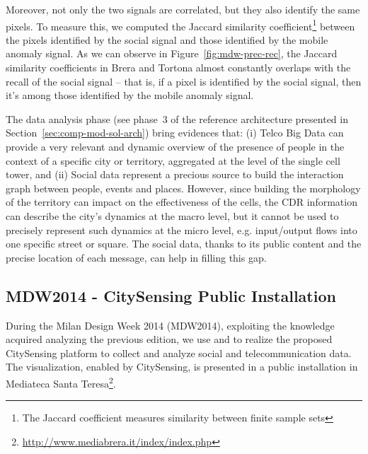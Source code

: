 Moreover, not only the two signals are correlated, but they also identify the same pixels. To measure this, we computed the Jaccard similarity coefficient\footnote{The Jaccard coefficient measures similarity between finite sample sets} between the pixels identified by the social signal and those identified by the mobile anomaly signal. 
As we can observe in Figure~\ref{fig:mdw-prec-rec}, the Jaccard similarity coefficients in Brera and Tortona almost constantly overlaps with the recall of the social signal -- that is, if a pixel is identified by the social signal, then it's among those identified by the mobile anomaly signal.


The data analysis phase (see phase~3 of the reference architecture presented in Section~\ref{sec:comp-mod-sol-arch}) bring evidences that: (i) Telco Big Data can provide a very relevant and dynamic overview of the presence of people in the context of a specific city or territory, aggregated at the level of the single cell tower, and (ii) Social data represent a precious source to build the interaction graph between people, events and places. 
However, since building the morphology of the territory can impact on the effectiveness of the cells, the CDR information can describe the city's dynamics at the macro level, but it cannot be used to precisely represent such dynamics at the micro level, e.g. input/output flows into one specific street or square. The social data, thanks to its public content and the precise location of each message, can help in filling this gap.

\subsection{MDW2014 - CitySensing Public Installation} \label{sec:cs-mdw-2014}
During the Milan Design Week 2014 (MDW2014), exploiting the knowledge acquired analyzing the previous edition, we use \sti{} and \hivedi{} to realize the proposed CitySensing platform to collect and analyze social and telecommunication data. 
The visualization, enabled by CitySensing, is presented in a public installation in Mediateca Santa Teresa\footnote{\url{http://www.mediabrera.it/index/index.php}}.

